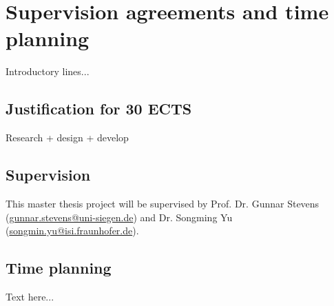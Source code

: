 \chapter{Supervision agreements and time planning} 

Introductory lines...

\section{Justification for 30 ECTS}

Research + design + develop

\section{Supervision}

This master thesis project will be supervised by 
Prof. Dr. Gunnar Stevens (\href{mailto:gunnar.stevens@uni-siegen.de}{gunnar.stevens@uni-siegen.de}) and 
Dr. Songming Yu (\href{mailto:songmin.yu@isi.fraunhofer.de}{songmin.yu@isi.fraunhofer.de}).  

\section{Time planning}

Text here...